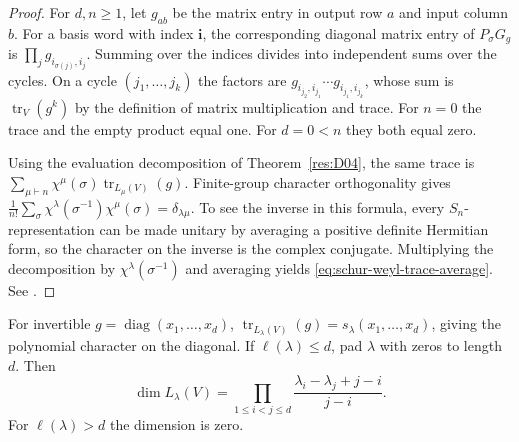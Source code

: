 \begin{proof}
For \(d,n\geq1\), let \(g_{ab}\) be the matrix entry in output
row \(a\) and input column \(b\). For a basis word with index
\(\mathbf i\), the corresponding diagonal matrix entry of
\(P_\sigma G_g\) is \(\prod_j g_{i_{\sigma(j)},i_j}\).
Summing over the indices divides into independent sums over the
cycles. On a cycle \((j_1,\ldots,j_k)\) the factors are
\(g_{i_{j_2},i_{j_1}}\cdots g_{i_{j_1},i_{j_k}}\), whose sum is
\(\operatorname{tr}_V(g^k)\) by the definition of matrix
multiplication and trace. For \(n=0\) the trace and the empty
product equal one. For \(d=0<n\) they both equal zero.

Using the evaluation decomposition of Theorem~\ref{res:D04},
the same trace is
\(\sum_{\mu\vdash n}\chi^\mu(\sigma)\operatorname{tr}_{L_\mu(V)}(g)\).
Finite-group character orthogonality
\cite[Chapter 8]{algebra-core} gives
\(\frac{1}{n!}\sum_\sigma\chi^\lambda(\sigma^{-1})\chi^\mu(\sigma)
=\delta_{\lambda\mu}\). To see the inverse in this formula,
every \(S_n\)-representation can be made unitary by averaging a
positive definite Hermitian form, so the character on the inverse
is the complex conjugate. Multiplying the decomposition by
\(\chi^\lambda(\sigma^{-1})\) and averaging yields
\eqref{eq:schur-weyl-trace-average}. See \cite[\S4.21]{etingof}.
\end{proof}

\begin{theorem}
\label{res:D08}
For invertible \(g=\operatorname{diag}(x_1,\ldots,x_d)\),
\(\operatorname{tr}_{L_\lambda(V)}(g)=s_\lambda(x_1,\ldots,x_d)\),
giving the polynomial character on the diagonal.
If \(\ell(\lambda)\leq d\), pad \(\lambda\) with zeros to length
\(d\). Then
\[
 \dim L_\lambda(V)=
    \prod_{1\leq i<j\leq d}\frac{\lambda_i-\lambda_j+j-i}{j-i}.
\]
For \(\ell(\lambda)>d\) the dimension is zero.
\end{theorem}

